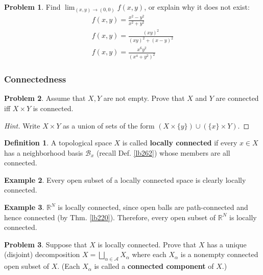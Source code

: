 \documentclass[12pt,b5paper,notitlepage]{article}
\theoremstyle{definition}
\newtheorem{df}{Definition}[section]
\newtheorem{eg}[df]{Example}
\newtheorem{prob}{\color{red}Problem}[section]
\theoremstyle{plain}
\newcommand{\mc}{\mathcal}
\newcommand{\scr}{\mathscr}
\newcommand{\Rbb}{\mathbb R}
\newcommand{\dps}{\displaystyle}
\numberwithin{equation}{section}
\begin{document}
\begin{prob}
Find $\dps\lim_{(x,y)\rightarrow(0,0)}f(x,y)$, or explain why it does not exist:
\begin{gather*}
f(x,y)=\frac{x^2-y^2}{x^2+y^2}\\
f(x,y)=\frac{(xy)^2}{(xy)^2+(x-y)^2}\\
f(x,y)=\frac{x^6y^2}{(x^4+y^2)^2}
\end{gather*}
\end{prob}








\subsubsection{Connectedness}

\begin{prob}
Assume that $X,Y$ are not empty. Prove that $X$ and $Y$ are connected iff $X\times Y$ is connected.
\end{prob}

\begin{proof}[Hint]
Write $X\times Y$ as a union of sets of the form $(X\times\{y\})\cup (\{x\}\times Y)$.
\end{proof}


\begin{df}
A topological space $X$ is called \textbf{locally connected}  if every $x\in X$ has a neighborhood basis $\mc B_x$ (recall Def. \ref{lb262}) whose members are all connected.
\end{df}

\begin{eg}
Every open subset of a locally connected space is clearly locally connected.
\end{eg}

\begin{eg}
$\Rbb^N$ is locally connected, since open balls are path-connected and hence connected (by Thm. \ref{lb220}). Therefore, every open subset of $\Rbb^N$ is locally connected.
\end{eg}


\begin{prob}\label{lb221}
Suppose that $X$ is locally connected. Prove that $X$ has a unique (disjoint) decomposition $X=\bigsqcup_{\alpha\in\scr A}X_\alpha$ where each $X_\alpha$ is a nonempty connected open subset of $X$. (Each $X_\alpha$ is called a \textbf{connected component} of $X$.) 
\end{prob}
\end{document}
